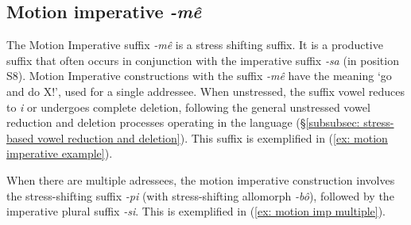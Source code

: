 \subsection{Motion imperative \textit{-mê}}
\label{subsec: motion imperative}

The Motion Imperative suffix \textit{-mê} is a stress shifting suffix. It is a productive suffix that often occurs in conjunction with the imperative suffix \textit{-sa} (in position S8). Motion Imperative constructions with the suffix \textit{-mê} have the meaning ‘go and do X!’, used for a single addressee. When unstressed, the suffix vowel reduces to \textit{i} or undergoes complete deletion, following the general unstressed vowel reduction and deletion processes operating in the language (§\ref{subsubsec: stress-based vowel reduction and deletion}). This suffix is exemplified in (\ref{ex: motion imperative example}).

\ea\label{ex: motion imperative example}

\newpage
    \z
\z

When there are multiple adressees, the motion imperative construction involves the stress-shifting suffix \textit{-pi} (with stress-shifting allomorph \textit{-bô}), followed by the imperative plural suffix\textit{ -si}. This is exemplified in (\ref{ex: motion imp multiple}).

